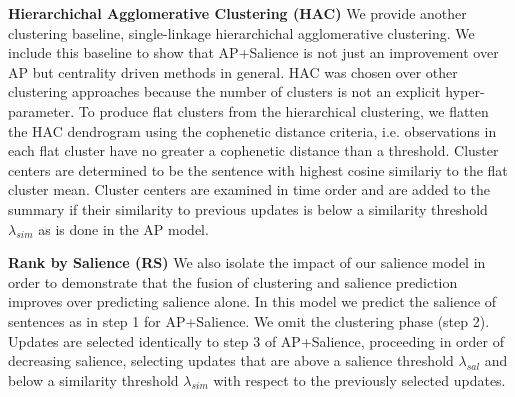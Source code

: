 \textbf{Hierarchichal Agglomerative Clustering (HAC)} We provide another clustering baseline, single-linkage hierarchichal agglomerative clustering.
We include this baseline to show that AP+Salience is not just an improvement
over AP but centrality driven methods in general.
HAC was chosen over other clustering approaches because the number of clusters 
is not an explicit hyper-parameter. To produce flat clusters from the hierarchical clustering, we flatten the HAC dendrogram
using the cophenetic distance criteria, i.e. observations in each flat cluster have no greater a cophenetic distance than a threshold.
Cluster centers are determined to be the sentence with highest cosine similariy to the flat cluster mean.
Cluster centers are examined in time order and are added to the summary if their similarity to previous updates is below a similarity threshold $\lambda_{sim}$ as is done in the AP model.

\textbf{Rank by Salience (RS)} 
We also isolate the impact of our salience model in order to demonstrate 
that the fusion of clustering and salience prediction improves over
predicting salience alone.
In this model we predict the salience of sentences as in step 1 for 
AP+Salience. %
We omit the clustering phase (step 2).
Updates are selected identically to step 3 of AP+Salience, proceeding 
in order of decreasing salience, selecting updates that are above a salience 
threshold $\lambda_{sal}$ and below a similarity threshold $\lambda_{sim}$
with respect to the previously selected updates.


%

